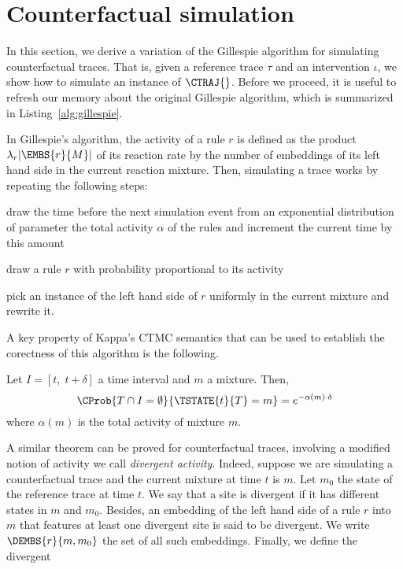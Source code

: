 \section{Counterfactual simulation}

In this section, we derive a variation of the Gillespie algorithm
for simulating counterfactual traces. That is, given a
reference trace $\tau$ and an intervention $\iota$, we show how to
simulate an instance of $\CTRAJ{}$. Before we proceed, 
it is useful to refresh our memory about
the original Gillespie algorithm, which is summarized in 
Listing~\ref{alg:gillespie}.


In Gillespie's algorithm, the activity of a rule $r$ is defined as
the product $\lambda_r|\EMBS{r}{M}|$ of its reaction rate by the number
of embeddings of its left hand side in the current reaction mixture.
Then, simulating a trace works by repeating the following steps:
\begin{inparaenum}[1)]
\item draw the time before the next simulation event from an exponential
distribution of parameter the total activity $\alpha$ of the rules and
increment the current time by this amount
\item draw a rule $r$ with probability proportional to its activity
\item pick an instance of the left hand side of $r$ uniformly in
the current mixture and rewrite it.
\end{inparaenum}
A key property of Kappa's CTMC semantics that can be used to establish 
the corectness of this algorithm is the following.
%
%
\begin{proposition}\label{prop:gillespie}
Let $I=[t,\; t+\delta]$ a time interval and $m$ a mixture. Then,
\[ \CProb{ T \cap I = \emptyset }{ \TSTATE{t}{T} = m } 
   = e^{-\alpha(m) \cdot \delta} \]
where $\alpha(m)$ is the total activity of mixture $m$.
\end{proposition}
%
%
%
A similar theorem can be proved for counterfactual traces, involving
a modified notion of activity we call \emph{divergent activity}.
Indeed, suppose we are simulating a counterfactual trace and the current
mixture at time $t$ is $m$. Let $m_0$ the state of the reference trace
at time $t$. We say that a site is divergent if it has
different states in $m$ and $m_0$.
Besides, an embedding of the left hand side of a rule $r$ into $m$
that features at least one divergent site is said to be divergent. We write
$\DEMBS{r}{m, m_0}$ the set of all such embeddings.
Finally, we define the divergent
